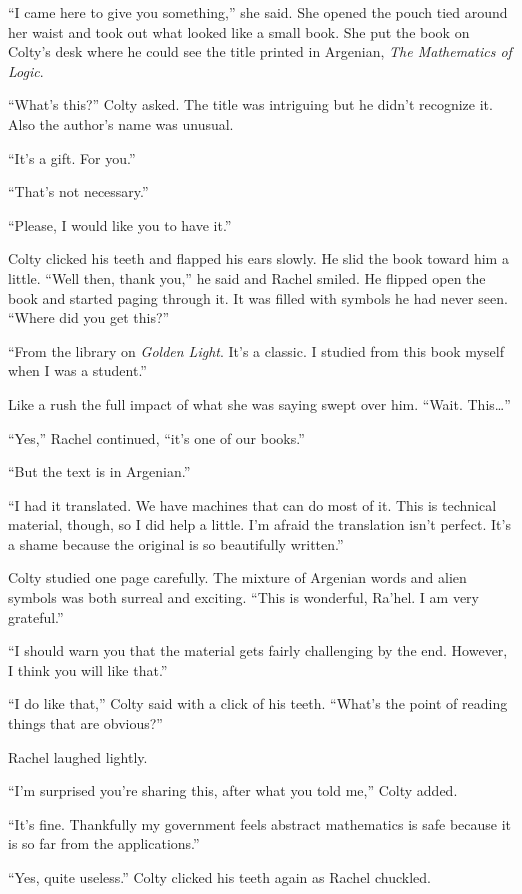 ``I came here to give you something,'' she said. She opened the pouch tied around her waist and
took out what looked like a small book. She put the book on Colty's desk where he could see the
title printed in Argenian, \textit{The Mathematics of Logic}.

``What's this?'' Colty asked. The title was intriguing but he didn't recognize it. Also the
author's name was unusual.

``It's a gift. For you.''

``That's not necessary.''

``Please, I would like you to have it.''

Colty clicked his teeth and flapped his ears slowly. He slid the book toward him a little.
``Well then, thank you,'' he said and Rachel smiled. He flipped open the book and started paging
through it. It was filled with symbols he had never seen. ``Where did you get this?''

``From the library on \textit{Golden Light}. It's a classic. I studied from this book myself
when I was a student.''

Like a rush the full impact of what she was saying swept over him. ``Wait. This\ldots''

``Yes,'' Rachel continued, ``it's one of our books.''

``But the text is in Argenian.''

``I had it translated. We have machines that can do most of it. This is technical material,
though, so I did help a little. I'm afraid the translation isn't perfect. It's a shame because
the original is so beautifully written.''

Colty studied one page carefully. The mixture of Argenian words and alien symbols was both
surreal and exciting. ``This is wonderful, Ra'hel. I am very grateful.''

``I should warn you that the material gets fairly challenging by the end. However, I think you
will like that.''

``I do like that,'' Colty said with a click of his teeth. ``What's the point of reading things
that are obvious?''

Rachel laughed lightly.

``I'm surprised you're sharing this, after what you told me,'' Colty added.

``It's fine. Thankfully my government feels abstract mathematics is safe because it is so far
from the applications.''

``Yes, quite useless.'' Colty clicked his teeth again as Rachel chuckled.

